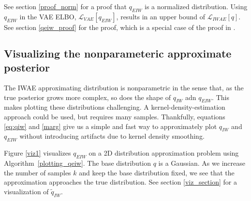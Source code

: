 \documentclass{article} %
\begin{document}
See section \ref{proof_norm} for a proof that $q_{EIW}$ is a normalized distribution. Using $q_{EIW}$ in the VAE ELBO, $\mathcal{L}_{VAE}[q_{EIW}]$, results in an upper bound of $\mathcal{L}_{IWAE}[q]$. See section \ref{qeiw_proof} for the proof, which is a special case of the proof in \cite{vsmc}.

\subsection{Visualizing the nonparameteric approximate posterior}
The IWAE approximating distribution is nonparametric in the sense that, as the true posterior grows more complex, so does the shape of $q_{IW}$ adn $q_{EIW}$.
This makes plotting these distributions challenging.
A kernel-density-estimation approach could be used, but requires many samples.
Thankfully, equations \eqref{eq:qiw} and \eqref{marg} give us a simple and fast way to approximately plot $q_{IW}$ and $q_{EIW}$ without introducing artifacts due to kernel density smoothing.

Figure \ref{viz1} visualizes $q_{EIW}$ on a 2D distribution approximation problem using Algorithm~\ref{plotting_qeiw}.
The base distribution $q$ is a Gaussian.
As we increase the number of samples $k$ and keep the base distribution fixed, we see that the approximation approaches the true distribution. See section \ref{viz_section} for a visualization of $\tilde{q}_{IW}$.
\end{document}
